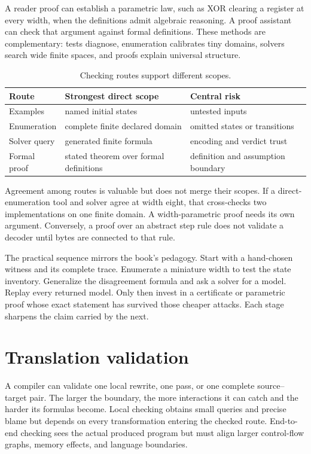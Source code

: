 A reader proof can establish a parametric law, such as XOR clearing a register
at every width, when the definitions admit algebraic reasoning. A proof
assistant can check that argument against formal definitions. These methods
are complementary: tests diagnose, enumeration calibrates tiny domains,
solvers search wide finite spaces, and proofs explain universal structure.

\begin{table}[htbp]
\centering
\caption{Checking routes support different scopes.}
\begin{tabular}{@{}p{}p{}p{}@{}}
\toprule
Route & Strongest direct scope & Central risk \\
\midrule
Examples & named initial states & untested inputs \\
Enumeration & complete finite declared domain & omitted states or transitions \\
Solver query & generated finite formula & encoding and verdict trust \\
Formal proof & stated theorem over formal definitions & definition and assumption boundary \\
\bottomrule
\end{tabular}
\end{table}

Agreement among routes is valuable but does not merge their scopes. If a
direct-enumeration tool and solver agree at width eight, that cross-checks two
implementations on one finite domain. A width-parametric proof needs its own
argument. Conversely, a proof over an abstract step rule does not validate a
decoder until bytes are connected to that rule.

The practical sequence mirrors the book's pedagogy. Start with a hand-chosen
witness and its complete trace. Enumerate a miniature width to test the state
inventory. Generalize the disagreement formula and ask a solver for a model.
Replay every returned model. Only then invest in a certificate or parametric
proof whose exact statement has survived those cheaper attacks. Each stage
sharpens the claim carried by the next.

\section{Translation validation}

A compiler can validate one local rewrite, one pass, or one complete source--
target pair. The larger the boundary, the more interactions it can catch and
the harder its formulas become. Local checking obtains small queries and
precise blame but depends on every transformation entering the checked route.
End-to-end checking sees the actual produced program but must align larger
control-flow graphs, memory effects, and language boundaries.

